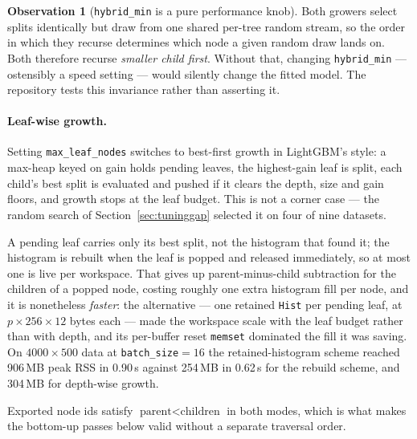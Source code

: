 \documentclass[11pt,a4paper]{article}
\newcommand{\code}[1]{\texttt{\small #1}}
\theoremstyle{definition}
\newtheorem{observation}{Observation}
\begin{document}
\begin{observation}[\code{hybrid\_min} is a pure performance knob]
Both growers select splits identically but draw from one shared per-tree random
stream, so the order in which they recurse determines which node a given random
draw lands on. Both therefore recurse \emph{smaller child first}. Without that,
changing \code{hybrid\_min} --- ostensibly a speed setting --- would silently
change the fitted model. The repository tests this invariance rather than
asserting it.
\end{observation}

\paragraph{Leaf-wise growth.} Setting \code{max\_leaf\_nodes} switches to
best-first growth in LightGBM's style: a max-heap keyed on gain holds pending
leaves, the highest-gain leaf is split, each child's best split is evaluated and
pushed if it clears the depth, size and gain floors, and growth stops at the
leaf budget. This is not a corner case --- the random search of
Section~\ref{sec:tuninggap} selected it on four of nine datasets.

A pending leaf carries only its best split, not the histogram that found it; the
histogram is rebuilt when the leaf is popped and released immediately, so at
most one is live per workspace. That gives up parent-minus-child subtraction for
the children of a popped node, costing roughly one extra histogram fill per
node, and it is nonetheless \emph{faster}: the alternative --- one retained
\code{Hist} per pending leaf, at $p \times 256 \times 12$ bytes each --- made the
workspace scale with the leaf budget rather than with depth, and its per-buffer
reset \code{memset} dominated the fill it was saving. On $4000 \times 500$ data
at \code{batch\_size}$=16$ the retained-histogram scheme reached 906\,MB peak RSS
in 0.90\,s against 254\,MB in 0.62\,s for the rebuild scheme, and 304\,MB for
depth-wise growth.

Exported node ids satisfy $\text{parent} < \text{children}$ in both modes, which
is what makes the bottom-up passes below valid without a separate traversal
order.
\end{document}
